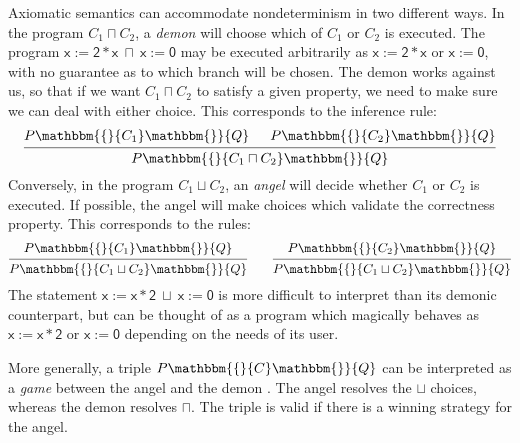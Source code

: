 \documentclass[sigplan,screen]{acmart}
\newcommand{\kw}[1]{\ensuremath{ \mathsf{#1} }}
\newcommand{\htr}[3]{{ {#1} \mathbbm{\{} {#2} \mathbbm{\}} {#3} }}
\begin{document}
Axiomatic semantics
can accommodate nondeterminism in two different ways.
In the program $C_1 \sqcap C_2$,
a \emph{demon} will choose which of $C_1$ or $C_2$ is executed.
The program $\kw{x := 2 * x} \: \sqcap \: \kw{x := 0}$
may be executed arbitrarily as $\kw{x := 2 * x}$ or $\kw{x := 0}$,
with no guarantee as to which branch will be chosen.
The demon works against us,
so that if we want $C_1 \sqcap C_2$ to satisfy a given property,
we need to make sure we can deal with either choice.
This corresponds to the inference rule:
\[
  \begin{prooftree}
    \hypo{\htr{P}{C_1}{Q}}
    \hypo{\htr{P}{C_2}{Q}}
    \infer2{\htr{P}{C_1 \sqcap C_2}{Q}}
  \end{prooftree}
\]
Conversely,
in the program $C_1 \sqcup C_2$,
an \emph{angel} will decide whether $C_1$ or $C_2$ is executed.
If possible,
the angel will make choices which validate
the correctness property.
This corresponds to the rules:
\[
  \begin{prooftree}
    \hypo{\htr{P}{C_1}{Q}}
    \infer1{\htr{P}{C_1 \sqcup C_2}{Q}}
  \end{prooftree}
  \qquad
  \begin{prooftree}
    \hypo{\htr{P}{C_2}{Q}}
    \infer1{\htr{P}{C_1 \sqcup C_2}{Q}}
  \end{prooftree}
\]
The statement $\kw{x := x * 2} \: \sqcup \: \kw{x := 0}$
is more difficult to interpret than its demonic counterpart,
but can be thought of as a program which magically behaves as
$\kw{x := x * 2}$ or $\kw{x := 0}$
depending on the needs of its user.

More generally,
a triple $\htr{P}{C}{Q}$
can be interpreted as a \emph{game}
between the angel and the demon \cite{refcal}.
The angel resolves the $\sqcup$ choices,
whereas the demon resolves $\sqcap$.
The triple is valid if there is a winning strategy
for the angel.

\end{document}
